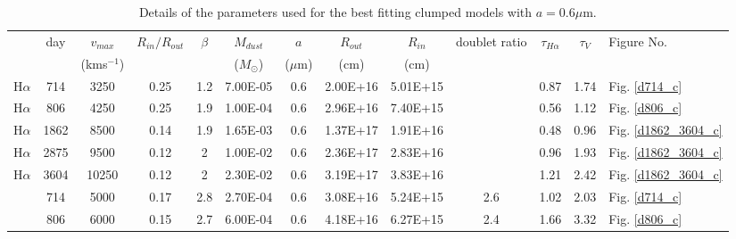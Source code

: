 \documentclass[useAMS,usenatbib,usegraphicx]{mnras}
\begin{document}
\begin{table}
	\begin{minipage}{180mm}
	\caption{Details of the parameters used for the best fitting clumped models with $a=0.6\mu$m.}
	\label{clumped1}
	\begin{center}
  	\begin{tabular}{@{} ccccccccccccl @{}}
    	\hline
 & day & $v_{max}$ & $R_{in}/R_{out}$ & $\beta$ & $M_{dust}$ & $a$ & $R_{out}$ & $R_{in}$ &  doublet ratio & $\tau_{H\alpha}$ & $\tau_V$  & Figure No. \\
	&& (kms$^{-1} $) & & & ($M_{\odot}$) & ($\mu$m) & (cm) & (cm)  \\
	\hline
H$\alpha$ & 714 & 3250 & 0.25 & 1.2 & 7.00E-05 & 0.6 & 2.00E+16 & 5.01E+15 & & 0.87 & 1.74 & Fig. \ref{d714_c} \\
H$\alpha$ & 806 & 4250 & 0.25 & 1.9 & 1.00E-04 & 0.6 & 2.96E+16 & 7.40E+15 & & 0.56 & 1.12 & Fig. \ref{d806_c}\\
H$\alpha$ & 1862 & 8500 & 0.14 & 1.9 & 1.65E-03 & 0.6 & 1.37E+17 & 1.91E+16 & & 0.48 & 0.96 & Fig. \ref{d1862_3604_c}\\
H$\alpha$ & 2875 & 9500 & 0.12 & 2 & 1.00E-02 & 0.6 & 2.36E+17 & 2.83E+16 & & 0.96 & 1.93 & Fig. \ref{d1862_3604_c}\\
H$\alpha$ & 3604 & 10250 & 0.12 & 2 & 2.30E-02 & 0.6 & 3.19E+17 & 3.83E+16 & & 1.21 & 2.42 & Fig. \ref{d1862_3604_c}\\ \relax
[OI] & 714 & 5000 & 0.17 & 2.8 & 2.70E-04 & 0.6 & 3.08E+16 & 5.24E+15 & 2.6 &  1.02 & 2.03 & Fig. \ref{d714_c}\\ \relax
[OI] & 806 & 6000 & 0.15 & 2.7 & 6.00E-04 & 0.6 & 4.18E+16 & 6.27E+15 & 2.4 & 1.66 & 3.32 & Fig. \ref{d806_c}\\
    \hline
  \end{tabular}
  \end{center}
\end{minipage}
\end{table}
\end{document}
